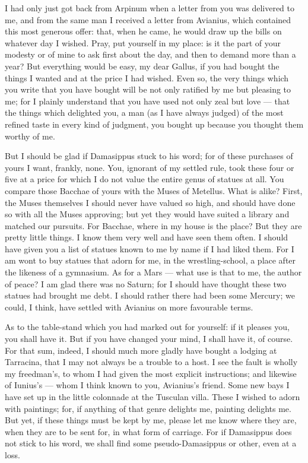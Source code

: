 

 I had only just got back from Arpinum when a letter from you was delivered to me, and from the same man I received a letter from Avianius, which contained this most generous offer: that, when he came, he would draw up the bills on whatever day I wished. Pray, put yourself in my place: is it the part of your modesty or of mine to ask first about the day, and then to demand more than a year? But everything would be easy, my dear Gallus, if you had bought the things I wanted and at the price I had wished. Even so, the very things which you write that you have bought will be not only ratified by me but pleasing to me; for I plainly understand that you have used not only zeal but love --- that the things which delighted you, a man (as I have always judged) of the most refined taste in every kind of judgment, you bought up because you thought them worthy of me.

 But I should be glad if Damasippus stuck to his word; for of these purchases of yours I want, frankly, none. You, ignorant of my settled rule, took these four or five at a price for which I do not value the entire genus of statues at all. You compare those Bacchae of yours with the Muses of Metellus. What is alike? First, the Muses themselves I should never have valued so high, and should have done so with all the Muses approving; but yet they would have suited a library and matched our pursuits. For Bacchae, where in my house is the place? But they are pretty little things. I know them very well and have seen them often. I should have given you a list of statues known to me by name if I had liked them. For I am wont to buy statues that adorn for me, in the wrestling-school, a place after the likeness of a gymnasium. As for a Mars --- what use is that to me, the author of peace? I am glad there was no Saturn; for I should have thought these two statues had brought me debt. I should rather there had been some Mercury; we could, I think, have settled with Avianius on more favourable terms.

 As to the table-stand which you had marked out for yourself: if it pleases you, you shall have it. But if you have changed your mind, I shall have it, of course. For that sum, indeed, I should much more gladly have bought a lodging at Tarracina, that I may not always be a trouble to a host. I see the fault is wholly my freedman's, to whom I had given the most explicit instructions; and likewise of Iunius's --- whom I think known to you, Avianius's friend. Some new bays I have set up in the little colonnade at the Tusculan villa. These I wished to adorn with paintings; for, if anything of that genre delights me, painting delights me. But yet, if these things must be kept by me, please let me know where they are, when they are to be sent for, in what form of carriage. For if Damasippus does not stick to his word, we shall find some pseudo-Damasippus or other, even at a loss.

